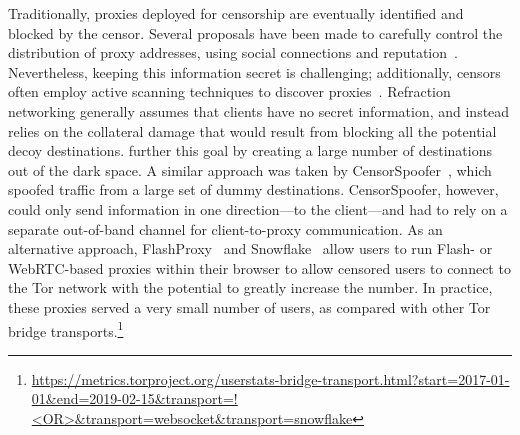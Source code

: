 Traditionally, proxies deployed for censorship are eventually identified and blocked by the censor. Several proposals have been made to carefully control  the distribution of proxy addresses, using social connections and reputation~\cite{proximax,rbridge,salmon}. Nevertheless, keeping this information secret is challenging; additionally, censors often employ active scanning techniques to discover proxies~\cite{Dunna2018a}. Refraction networking generally assumes that clients have no secret information, and instead relies on the  collateral damage that would result from blocking all the potential decoy destinations. \scheme further this goal by creating a large number of destinations out of the dark space. A similar approach was taken by CensorSpoofer~\cite{censorspoofer}, which spoofed traffic from a large set of dummy destinations. CensorSpoofer, however, could only send information in one direction---to the client---and had to rely on a separate out-of-band channel for client-to-proxy communication. As an alternative approach, FlashProxy~\cite{flash-proxies} and Snowflake~\cite{snowflake} allow users to run Flash- or WebRTC-based proxies within their browser to allow censored users to connect to the Tor network with the potential to greatly increase the number. In practice, these proxies served a very small number of users, as compared with other Tor bridge transports.\footnote{\url{https://metrics.torproject.org/userstats-bridge-transport.html?start=2017-01-01&end=2019-02-15&transport=!<OR>&transport=websocket&transport=snowflake}}
